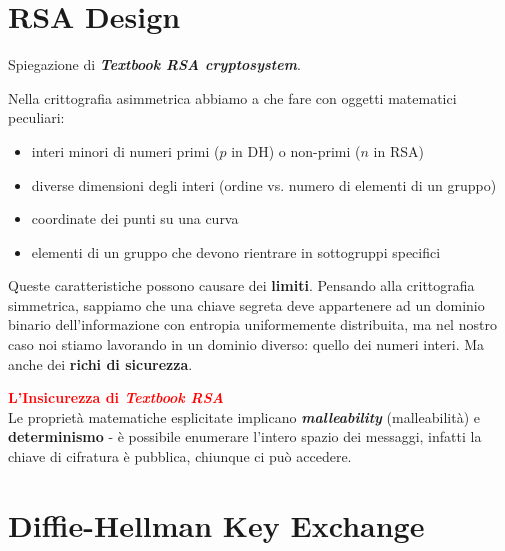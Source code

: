 \section{RSA Design}

\begin{flushleft}
    Spiegazione di \textbf{\textit{Textbook RSA cryptosystem}}.

    \smallskip
    
    Nella crittografia asimmetrica abbiamo a che fare con oggetti matematici peculiari:
    \begin{itemize}[nosep]
        \item interi minori di numeri primi ($p$ in DH) o non-primi ($n$ in RSA)
        \item diverse dimensioni degli interi (ordine vs. numero di elementi di un gruppo)
        \item coordinate dei punti su una curva
        \item elementi di un gruppo che devono rientrare in sottogruppi specifici
    \end{itemize}
    
    Queste caratteristiche possono causare dei \textbf{limiti}. Pensando alla crittografia simmetrica, sappiamo che una chiave segreta deve appartenere ad un dominio binario dell'informazione con entropia uniformemente distribuita, ma nel nostro caso noi stiamo lavorando in un dominio diverso: quello dei numeri interi. Ma anche dei \textbf{richi di sicurezza}.

    \smallskip

    \textcolor{red}{\textbf{L'Insicurezza di \textit{Textbook RSA}}} \\
    Le proprietà matematiche esplicitate implicano \textbf{\textit{malleability}} (malleabilità) e \textbf{determinismo} - è possibile enumerare l'intero spazio dei messaggi, infatti la chiave di cifratura è pubblica, chiunque ci può accedere.
\end{flushleft}

\section{Diffie-Hellman Key Exchange}

